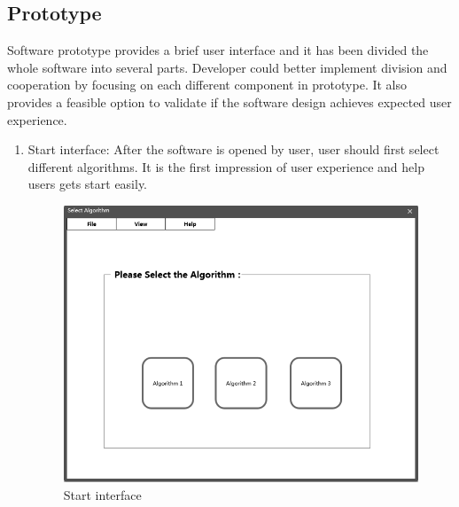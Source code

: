 \documentclass[11pt,oneside,a4paper]{article}
\begin{document}
\subsection{Prototype}
Software prototype provides a brief user interface and it has been divided the whole software into several parts. Developer could better implement division and cooperation by focusing on each different component in prototype. It also provides a feasible option to validate if the software design achieves expected user experience.
\begin{enumerate}
  \item Start interface: After the software is opened by user, user should first select different algorithms. It is the first impression of user experience and help users gets start easily.
  \begin{figure}[H]
    \begin{center}
    \includegraphics[height=0.3\textheight]{./source/Requirement/2.png}
    \caption{Start interface}
    \label{}
    \end{center}
  \end{figure}


\end{enumerate}
\end{document}
